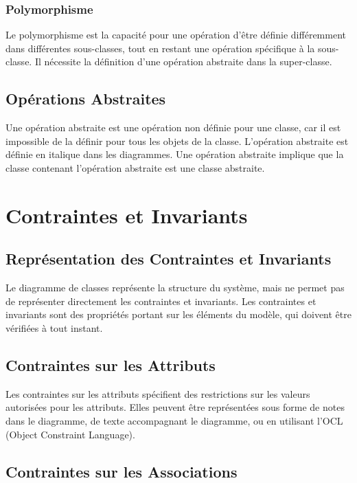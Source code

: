 \documentclass{article}
\begin{document}
\begin{itemize}
\subsubsection{Polymorphisme}

Le polymorphisme est la capacité pour une opération d'être définie différemment dans différentes sous-classes, tout en restant une opération spécifique à la sous-classe.  Il nécessite la définition d'une opération abstraite dans la super-classe.

\subsection{Opérations Abstraites}

Une opération abstraite est une opération non définie pour une classe, car il est impossible de la définir pour tous les objets de la classe. L'opération abstraite est définie en italique dans les diagrammes. Une opération abstraite implique que la classe contenant l'opération abstraite est une classe abstraite.

\section{Contraintes et Invariants}

\subsection{Représentation des Contraintes et Invariants}

Le diagramme de classes représente la structure du système, mais ne permet pas de représenter directement les contraintes et invariants.  Les contraintes et invariants sont des propriétés portant sur les éléments du modèle, qui doivent être vérifiées à tout instant.

\subsection{Contraintes sur les Attributs}

Les contraintes sur les attributs spécifient des restrictions sur les valeurs autorisées pour les attributs.  Elles peuvent être représentées sous forme de notes dans le diagramme, de texte accompagnant le diagramme, ou en utilisant l'OCL (Object Constraint Language).

\subsection{Contraintes sur les Associations}


\end{itemize}
\end{document}
